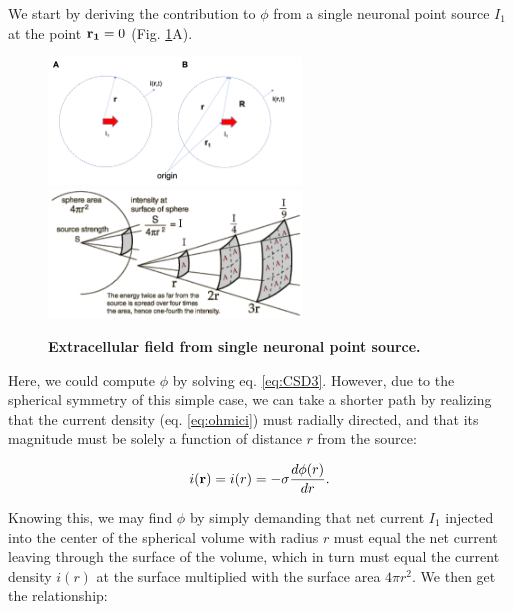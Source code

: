 \subsubsection{}
We start by deriving the contribution to $\phi$ from a single neuronal point source $I_1$ at the point ${\bf r_1}=0$ (Fig. \ref{VC:fig:pointsource}A). 

\begin{figure}[!ht]
\begin{center}
\includegraphics[width=0.6\textwidth]{Figures/VC/Pointsource.png}
\includegraphics[width=0.6\textwidth]{Figures/VC/pointsource_3D_illustration.png}
\end{center}
\caption{\textbf{Extracellular field from single neuronal point source.} 
}
\label{VC:fig:pointsource}
\end{figure}

Here, we could compute $\phi$ by solving eq. \ref{eq:CSD3}. However, due to the spherical symmetry of this simple case, we can take a shorter path by realizing that the current density (eq. \ref{eq:ohmici}) must radially directed, and that its magnitude must be solely a function of distance $r$ from the source:

\begin{equation}
i({\bf r}) = i(r) = -\sigma \frac{d\phi(r)}{dr}.
\end{equation}

Knowing this, we may find $\phi$ by simply demanding that net current $I_1$ injected into the center of the spherical volume with radius $r$ must equal the net current leaving through the surface of the volume, which in turn must equal the current density $i(r)$ at the surface multiplied with the surface area $4\pi r^2$. We then get the relationship:

